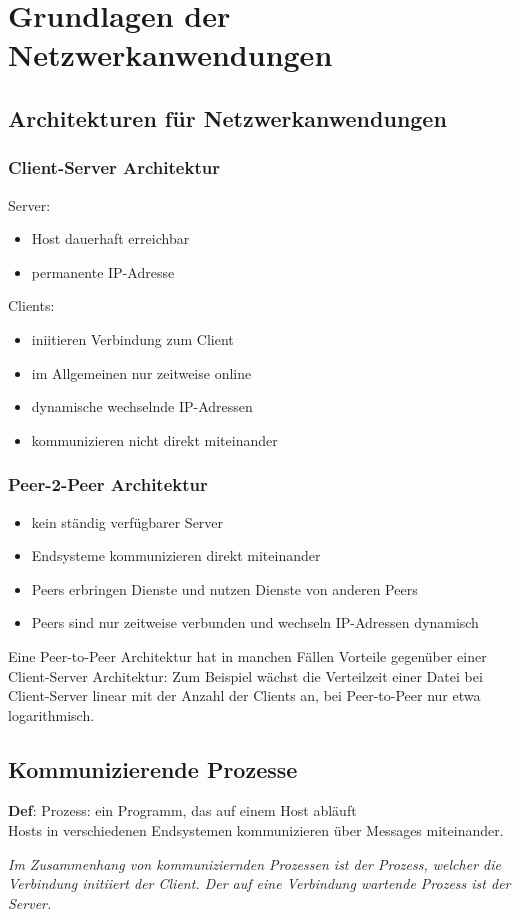 

\section{Grundlagen der Netzwerkanwendungen}
\subsection{Architekturen für Netzwerkanwendungen}

\subsubsection{Client-Server Architektur}
Server:
\begin{itemize}
    \item Host dauerhaft erreichbar
    \item permanente IP-Adresse
\end{itemize}

\noindent Clients:
\begin{itemize}
    \item iniitieren Verbindung zum Client
    \item im Allgemeinen nur zeitweise online
    \item dynamische wechselnde IP-Adressen
    \item kommunizieren nicht direkt miteinander
\end{itemize}

\subsubsection{Peer-2-Peer Architektur}
\begin{itemize}
    \item kein ständig verfügbarer Server
    \item Endsysteme kommunizieren direkt miteinander
    \item Peers erbringen Dienste und nutzen Dienste von anderen Peers
    \item Peers sind nur zeitweise verbunden und wechseln IP-Adressen dynamisch
\end{itemize}
\noindent
Eine Peer-to-Peer Architektur hat in manchen Fällen Vorteile gegenüber einer Client-Server Architektur: Zum Beispiel wächst die Verteilzeit einer Datei bei Client-Server linear mit der Anzahl der Clients an, bei Peer-to-Peer nur etwa logarithmisch.

\subsection{Kommunizierende Prozesse}
\textbf{Def}: Prozess: ein Programm, das auf einem Host abläuft\\
Hosts in verschiedenen Endsystemen kommunizieren über Messages miteinander.
\begin{center}
    \textit{Im Zusammenhang von kommuniziernden Prozessen ist der Prozess, welcher die Verbindung initiiert der Client. Der auf eine Verbindung wartende Prozess ist der Server.}
\end{center}

